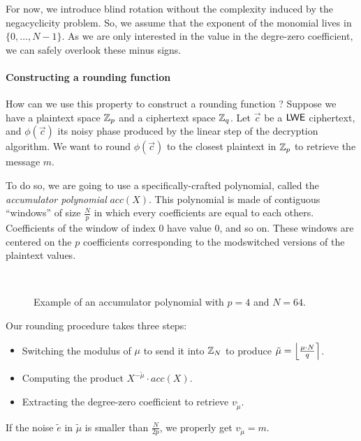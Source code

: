 For now, we introduce blind rotation without the complexity induced by the negacyclicity problem. So, we assume that the exponent of the monomial lives in $\lbrace 0, \dots, N-1 \rbrace$. As we are only interested in the value in the degre-zero coefficient, we can safely overlook these minus signs.

\paragraph{Constructing a rounding function}
How can we use this property to construct a rounding function ? Suppose we have a plaintext space $\mathbb{Z}_p$ and a ciphertext space $\mathbb{Z}_q$. Let $\vec c$ be  a $\textsf{LWE}$ ciphertext, and $\phi(\vec c)$ its noisy phase produced by the linear step of the decryption algorithm. We want to round $\phi(\vec c)$ to the closest plaintext in $\mathbb{Z}_p$ to retrieve the message $m$.

To do so, we are going to use a specifically-crafted polynomial, called the \textit{accumulator polynomial} $acc(X)$. This polynomial is made of contiguous ``windows'' of size $\frac N p$ in which every coefficients are equal to each others. Coefficients of the window of index 0 have value 0, and so on. These windows are centered on the $p$ coefficients corresponding to the modswitched versions of the plaintext values.





\begin{figure}[htbp]
	\centering
	 \\[1em] %
	\label{fig:illustration_accumulator}
	\caption{Example of an accumulator polynomial with $p=4$ and $N=64$.}
\end{figure}



Our rounding procedure takes three steps:
\begin{itemize}
	\item Switching the modulus of $\mu$ to send it into $\mathbb{Z}_N$ to produce $\tilde \mu = \left \lfloor \frac{\mu \cdot N}{q} \right \rceil$.
	\item Computing the product $X^{- \tilde \mu} \cdot acc(X)$.
	\item Extracting the degree-zero coefficient to retrieve $v_{\tilde \mu}$.
\end{itemize}

If the noise $\tilde e$ in $\tilde \mu$ is smaller than $\frac{N}{2p}$, we properly get $v_{\tilde \mu} = m$. 

